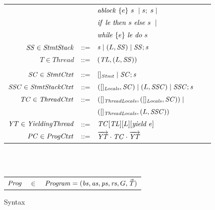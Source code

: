 \begin{figure}
\begin{tabular}{rclcl}
                  & & $\mathit{ablock}\ {\{e\}}\ {s}\  \mid s;\;s \mid$\\
                 & & ${\mathit{if}\ {\mathit{le}}\ }{\mathit{then}\ {s}\ }{\mathit{else}\ {s}\ } \mid$ \\
                  & & $\mathit{while}\ \{{e}\}\ {{\mathit{le}}\ } \mathit{do}\ {{s}\ }$ \\ 
$\mathit{SS} \in \mathit{StmtStack}$ &::= & $\mathit{s} \mid (L,\mathit{SS}) \mid \mathit{SS};\mathit{s}$ \\
$T \in \mathit{Thread}$ &::= &$(\mathit{TL}, (L, \mathit{SS}))$ \\
\\
$\mathit{SC} \in \mathit{StmtCtxt}$ &::= &$[]_{Stmt} \mid \mathit{SC};\mathit{s}$ \\
$\mathit{SSC} \in \mathit{StmtStackCtxt}$ &::= & $([]_{\mathit{Locals}}, \mathit{SC}) \mid (L,\mathit{SSC}) \mid \mathit{SSC};\mathit{s}$ \\
$\mathit{TC} \in \mathit{ThreadCtxt}$ &::= &$([]_{\mathit{ThreadLocals}}, ([]_{\mathit{Locals}}, \mathit{SC})) \mid$ \\
 & &$([]_{\mathit{ThreadLocals}}, (L, \mathit{SSC}))$ \\
$\mathit{YT} \in \mathit{YieldingThread}$ &::= &$\mathit{TC}[\mathit{TL}][L][\mathit{yield}\ e]$ \\
$\mathit{PC} \in \mathit{ProgCtxt}$ &::= &$\overrightarrow{\mathit{YT}} \cdot \mathit{TC} \cdot \overrightarrow{\mathit{YT}}$ \\
\end{tabular}
~\\
~\\
\begin{tabular}{rcl}
$\mathit{Prog}$ & $\in$ & $\mathit{Program} = (\mathit{bs}, \mathit{as}, \mathit{ps}, \mathit{rs}, G, \vec{\mathit{T}})$ \\
\end{tabular}
\setlength{\tabcolsep}{6pt}
\caption{Syntax}
\label{fig:syntax}
\end{figure}

